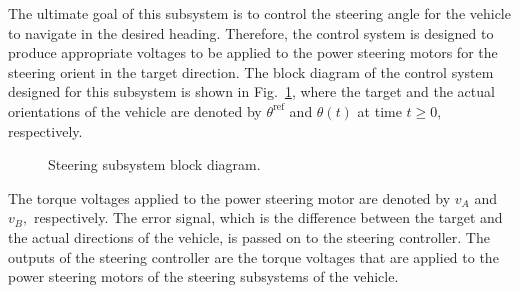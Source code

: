 \documentclass[conference]{IEEEtran}
\begin{document}
The ultimate goal of this subsystem is to control the steering angle for the vehicle to navigate in the desired heading. Therefore, the control system is designed to produce appropriate voltages to be applied to the power steering motors for the steering orient in the target direction. The block diagram of the control system designed for this subsystem is shown in Fig.~\ref{fig:steeringModelBlockDiagram}, where the target and the actual orientations of the vehicle are denoted by $\theta^{\text{ref}}$ and $\theta(t)$ at time $t\ge 0,$ respectively. %
%
\begin{figure}[htbp]
  \centering
  \caption{Steering subsystem block diagram.}
  \label{fig:steeringModelBlockDiagram}
\end{figure}
%
The torque voltages applied to the power steering motor are denoted by $v_{A}$ and $v_{B},$ respectively.  The error signal, which is the difference between the target and the actual directions of the vehicle, is passed on to the steering controller. The outputs of the steering controller are the torque voltages that are applied to the power steering motors of the steering subsystems of the vehicle.
\end{document}
